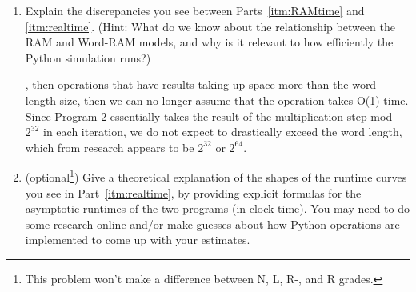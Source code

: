 \documentclass[11pt]{report}
\begin{document}
\begin{enumerate}
\begin{enumerate}
    \color{blue}{Here program 1 actually seems to take longer than program 2; program 1 appears to run in exponential time, indicating that perhaps one or more of the operations we took for granted in program 1 is/are not actually one time step.}
    \item Explain the discrepancies you see between Parts~\ref{itm:RAMtime} and \ref{itm:realtime}.  (Hint: What do we know about the relationship between the RAM and Word-RAM models, and why is it relevant to how efficiently the Python simulation runs?)

    , then operations that have results taking up space more than the word length size, then we can no longer assume that the operation takes O(1) time. Since Program 2 essentially takes the result of the multiplication step mod $2^{32}$ in each iteration, we do not expect to drastically exceed the word length, which from research appears to be $2^{32}$ or $2^{64}$. 
    \color{blue}{My guess at this point is that since the result variable in Program 1 exponentially increases, the time steps to account for the overflow in the word length may also increase with each iteration, which results in the exponential as opposed to linear growth.}
    \item (optional\footnote{This problem won't make a difference between N, L, R-, and R grades.}) Give a theoretical explanation of the shapes of the runtime curves you see in Part~\ref{itm:realtime}, by providing explicit formulas for the asymptotic runtimes of the two programs (in clock time). You may need to do some research online and/or make guesses about how Python operations are implemented to come up with your estimates.

\end{enumerate}


\end{enumerate}
\end{document}
